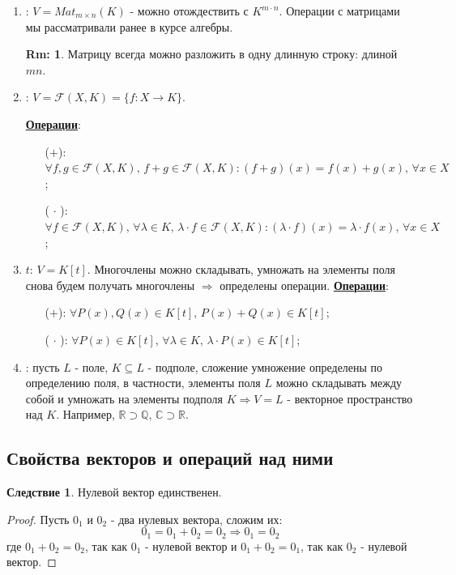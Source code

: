 \documentclass[12pt]{article}
\newcommand{\MR}{\mathbb{R}}
\newcommand{\MC}{\mathbb{C}}
\newcommand{\MQ}{\mathbb{Q}}
\newcommand{\MF}{\mathcal{F}}
\theoremstyle{definition}
\newtheorem{rem}{Rm:}
\newtheorem{corollary}{Следствие}
\newcommand{\mat}[2]{Mat_{#1\times #2}}
\begin{document}
\begin{enumerate}[label=\arabic*)]
	\item {}: $V = \mat{m}{n}(K)$ - можно отождествить с $K^{m{\cdot}n}$. Операции с матрицами мы рассматривали ранее в курсе алгебры.
	\begin{rem}
		Матрицу всегда можно разложить в одну длинную строку: длиной $mn$.
	\end{rem}

	\item {}: $V =  \MF(X,K) = \{f \colon X \to K\}$.
	
	\textbf{\uline{Операции}}: 
	\begin{enumerate}
		\item[($+$):] $\forall f,g \in \MF(X,K), \, f + g \in \MF(X,K) \colon (f+g)(x) = f(x) + g(x), \, \forall x \in X$;
		\item[($\, \cdot\, $):] $\forall f \in \MF(X,K), \, \forall \lambda \in K, \, \lambda{\cdot}f \in \MF(X,K) \colon (\lambda{\cdot}f)(x) = \lambda{\cdot}f(x), \, \forall x \in X$;
	\end{enumerate}
	
	\item {} $t$: $V = K[t]$. Многочлены можно складывать, умножать на элементы поля снова будем получать многочлены $\Rightarrow$ определены операции.
	\textbf{\uline{Операции}}: 
	\begin{enumerate}
		\item[($+$):] $\forall P(x),Q(x) \in K[t], \, P(x) + Q(x) \in K[t]$;
		\item[($\, \cdot\, $):] $\forall P(x) \in K[t], \, \forall \lambda \in K, \, \lambda{\cdot}P(x) \in K[t]$;
	\end{enumerate}
	
	
	\item {}: пусть $L$ - поле, $K \subseteq L$ - подполе, сложение умножение определены по определению поля, в частности, элементы поля $L$ можно складывать между собой и умножать на элементы подполя $K \Rightarrow V = L$ - векторное пространство над $K$. Например, $\MR \supset \MQ$, $\MC \supset \MR$.	
\end{enumerate}

\newpage
\subsection*{Свойства векторов и операций над ними}

\begin{corollary}
	Нулевой вектор единственен.
\end{corollary}
\begin{proof}
	Пусть $0_1$ и $0_2$ - два нулевых вектора, сложим их: 
	$$
		0_1 = 0_1 + 0_2 = 0_2 \Rightarrow 0_1 = 0_2
	$$
	где $0_1 + 0_2 = 0_2$, так как $0_1$ - нулевой вектор и $0_1 + 0_2 = 0_1$, так как $0_2$ - нулевой вектор.
\end{proof}
\end{document}
